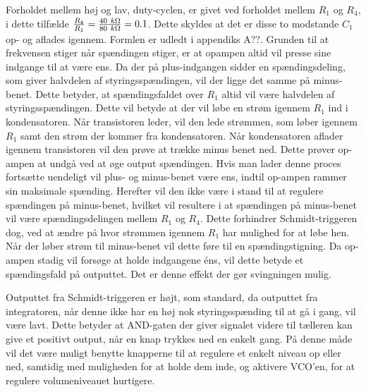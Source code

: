 Forholdet mellem høj og lav, duty-cyclen, er givet ved forholdet mellem $R_1$ og $R_4$, i dette tilfælde $\frac{R_4}{R_1} = \frac{40~k\ohm}{80~k\ohm}=0.1$. Dette skyldes at det er disse to modstande $C_1$ op- og aflades igennem. Formlen er udledt i appendiks A??. Grunden til at frekvensen stiger når spændingen stiger, er at opampen altid vil presse sine indgange til at være ens. Da der på plus-indgangen sidder en spændingsdeling, som giver halvdelen af styringsspændingen, vil der ligge det samme på minus-benet. Dette betyder, at spændingsfaldet over $R_1$ altid vil være halvdelen af styringsspændingen. Dette vil betyde at der vil løbe en strøm igennem $R_1$ ind i kondensatoren. Når transistoren leder, vil den lede strømmen, som løber igennem $R_1$ samt den strøm der kommer fra kondensatoren. Når kondensatoren aflader igennem transistoren vil den prøve at trække minus benet ned. Dette prøver op-ampen at undgå ved at øge output spændingen. Hvis man lader denne proces fortsætte uendeligt vil plus- og minus-benet være ens, indtil op-ampen rammer sin maksimale spænding. Herefter vil den ikke være i stand til at regulere spændingen på minus-benet, hvilket vil resultere i at spændingen på minus-benet vil være spændingsdelingen mellem $R_1$ og $R_4$. Dette forhindrer Schmidt-triggeren dog, ved at ændre på hvor strømmen igennem $R_1$ har mulighed for at løbe hen. Når der løber strøm til minus-benet vil dette føre til en spændingstigning. Da op-ampen stadig vil forsøge at holde indgangene éns, vil dette betyde et spændingsfald på outputtet. Det er denne effekt der gør svingningen mulig.

Outputtet fra Schmidt-triggeren er højt, som standard, da outputtet fra integratoren, når denne ikke har en høj nok styringsspænding til at gå i gang, vil være lavt. Dette betyder at AND-gaten der giver signalet videre til tælleren kan give et positivt output, når en knap trykkes ned en enkelt gang. På denne måde vil det være muligt benytte knapperne til at regulere et enkelt niveau op eller ned, samtidig med muligheden for at holde dem inde, og aktivere VCO'en, for at regulere volumeniveauet hurtigere.





